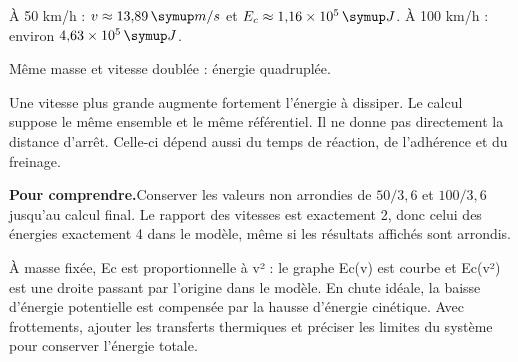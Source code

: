 \par\noindent\begin{minipage}{\linewidth}
\label{cor-defi-11}\begin{questions}
\item À 50 km/h : $v\approx13{,}89\unite{m/s}$ et $E_c\approx1{,}16\times10^5\unite J$. À 100 km/h : environ $4{,}63\times10^5\unite J$.
\item Même masse et vitesse doublée : énergie quadruplée.
\item Une vitesse plus grande augmente fortement l’énergie à dissiper. Le calcul suppose le même ensemble et le même référentiel. Il ne donne pas directement la distance d’arrêt. Celle-ci dépend aussi du temps de réaction, de l’adhérence et du freinage.
\end{questions}
\par\smallskip\noindent\textbf{Pour comprendre.}\enspace Conserver les valeurs non arrondies de $50/3{,}6$ et $100/3{,}6$ jusqu’au calcul final. Le rapport des vitesses est exactement 2, donc celui des énergies exactement 4 dans le modèle, même si les résultats affichés sont arrondis.\par
{}
\end{minipage}
\par\noindent\begin{minipage}{\linewidth}
\label{cor-activite-11}
À masse fixée, Ec est proportionnelle à v² : le graphe Ec(v) est courbe et Ec(v²) est une droite passant par l’origine dans le modèle. En chute idéale, la baisse d’énergie potentielle est compensée par la hausse d’énergie cinétique. Avec frottements, ajouter les transferts thermiques et préciser les limites du système pour conserver l’énergie totale.\par\end{minipage}
